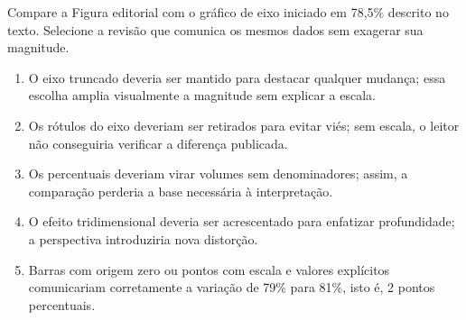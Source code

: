 \documentclass[12pt,a4paper]{article}
\begin{document}
\FonteDidatica
\Comando Compare a Figura editorial com o gráfico de eixo iniciado em 78,5\% descrito no texto. Selecione a revisão que comunica os mesmos dados sem exagerar sua magnitude.

\begin{enumerate}[label=\Alph*)]
  \item O eixo truncado deveria ser mantido para destacar qualquer mudança; essa escolha amplia visualmente a magnitude sem explicar a escala.
  \item Os rótulos do eixo deveriam ser retirados para evitar viés; sem escala, o leitor não conseguiria verificar a diferença publicada.
  \item Os percentuais deveriam virar volumes sem denominadores; assim, a comparação perderia a base necessária à interpretação.
  \item O efeito tridimensional deveria ser acrescentado para enfatizar profundidade; a perspectiva introduziria nova distorção.
  \item Barras com origem zero ou pontos com escala e valores explícitos comunicariam corretamente a variação de 79\% para 81\%, isto é, 2 pontos percentuais.
\end{enumerate}
\end{document}
